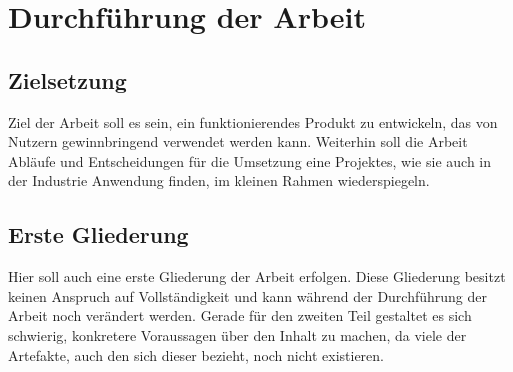 \section{Durchführung der Arbeit}
\subsection{Zielsetzung}
Ziel der Arbeit soll es sein, ein funktionierendes Produkt zu entwickeln, das von Nutzern gewinnbringend verwendet werden kann.
Weiterhin soll die Arbeit Abläufe und Entscheidungen für die Umsetzung eine Projektes, wie sie auch in der Industrie Anwendung finden, im kleinen Rahmen wiederspiegeln.

\subsection{Erste Gliederung}
Hier soll auch eine erste Gliederung der Arbeit erfolgen. Diese Gliederung besitzt keinen Anspruch auf Vollständigkeit und kann während der Durchführung der Arbeit noch verändert werden.
Gerade für den zweiten Teil gestaltet es sich schwierig, konkretere Voraussagen über den Inhalt zu machen, da viele der Artefakte, auch den sich dieser bezieht, noch nicht existieren.

